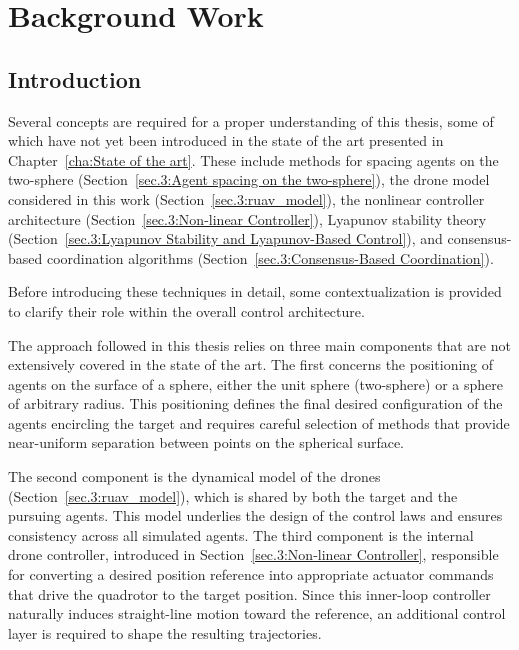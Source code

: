 
%

\chapter{Background Work}
\label{cha:Background work}

\glsresetall

\section{Introduction}
\label{sec.3:Introduction}

Several concepts are required for a proper understanding of this thesis, some of which have not yet been introduced in the state of the art presented in Chapter~\ref{cha:State of the art}. These include methods for spacing agents on the two-sphere (Section~\ref{sec.3:Agent spacing on the two-sphere}), the drone model considered in this work (Section~\ref{sec.3:ruav_model}), the nonlinear controller architecture (Section~\ref{sec.3:Non-linear Controller}), Lyapunov stability theory (Section~\ref{sec.3:Lyapunov Stability and Lyapunov-Based Control}), and consensus-based coordination algorithms (Section~\ref{sec.3:Consensus-Based Coordination}).

Before introducing these techniques in detail, some contextualization is provided to clarify their role within the overall control architecture.

The approach followed in this thesis relies on three main components that are not extensively covered in the state of the art. The first concerns the positioning of agents on the surface of a sphere, either the unit sphere (two-sphere) or a sphere of arbitrary radius. This positioning defines the final desired configuration of the agents encircling the target and requires careful selection of methods that provide near-uniform separation between points on the spherical surface.

The second component is the dynamical model of the drones (Section~\ref{sec.3:ruav_model}), which is shared by both the target and the pursuing agents. This model underlies the design of the control laws and ensures consistency across all simulated agents. The third component is the internal drone controller, introduced in Section~\ref{sec.3:Non-linear Controller}, responsible for converting a desired position reference into appropriate actuator commands that drive the quadrotor to the target position. Since this inner-loop controller naturally induces straight-line motion toward the reference, an additional control layer is required to shape the resulting trajectories.

